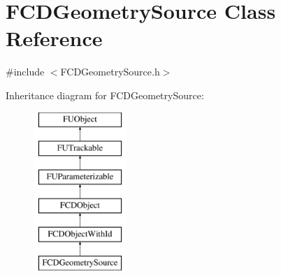 \hypertarget{classFCDGeometrySource}{
\section{FCDGeometrySource Class Reference}
\label{classFCDGeometrySource}
}


{\ttfamily \#include $<$FCDGeometrySource.h$>$}

Inheritance diagram for FCDGeometrySource:\begin{figure}[H]
\begin{center}
\leavevmode
\includegraphics[height=6.000000cm]{classFCDGeometrySource}
\end{center}
\end{figure}
